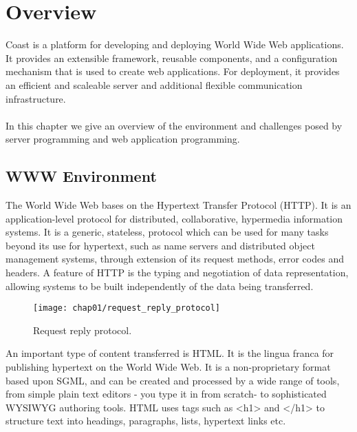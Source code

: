 \clearpage{}
\chapter{Overview}\label{Overview}
Coast is a platform for developing and deploying World Wide Web
applications. It provides an extensible framework, reusable
components, and a configuration mechanism that is used to create web
applications. For deployment, it provides an efficient and scaleable
server and additional flexible communication infrastructure.\\
\\
In this chapter we give an overview of the environment and challenges
posed by server programming and web application programming.

\section{WWW Environment}
The World Wide Web bases on the Hypertext Transfer Protocol (HTTP). It
is an application-level protocol for distributed, collaborative,
hypermedia information systems. It is a generic, stateless, protocol
which can be used for many tasks beyond its use for hypertext, such as
name servers and distributed object management systems, through
extension of its request methods, error codes and headers. A feature
of HTTP is the typing and negotiation of data representation, allowing
systems to be built independently of the data being transferred.

\begin{figure}[hbt]
  \centering
  \texttt{[image: chap01/request\_reply\_protocol]}
  \caption{Request reply protocol.}
  \label{fig:request_reply_protocol}
\end{figure}

An important type of content transferred is HTML. It is the lingua
franca for publishing hypertext on the World Wide Web. It is a
non-proprietary format based upon SGML, and can be created and
processed by a wide range of tools, from simple plain text editors -
you type it in from scratch- to sophisticated WYSIWYG authoring tools.
HTML uses tags such as <h1> and </h1> to structure text into headings,
paragraphs, lists, hypertext links etc.

